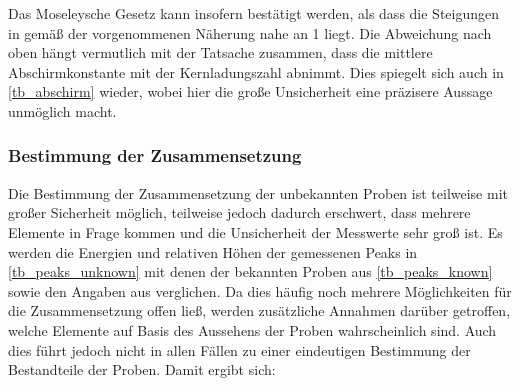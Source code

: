 \documentclass[
	a4paper,
	12pt,
	pagesize,
	ngerman
]{scrartcl}
\begin{document}
	Das Moseleysche Gesetz kann insofern bestätigt werden, als dass die Steigungen in  gemäß der vorgenommenen Näherung nahe an \num{1} liegt.
	Die Abweichung nach oben hängt vermutlich mit der Tatsache zusammen, dass die mittlere Abschirmkonstante mit der Kernladungszahl abnimmt.
	Dies spiegelt sich auch in \cref{tb_abschirm} wieder, wobei hier die große Unsicherheit eine präzisere Aussage unmöglich macht.

	\subsubsection{Bestimmung der Zusammensetzung}
	Die Bestimmung der Zusammensetzung der unbekannten Proben ist teilweise mit großer Sicherheit möglich, teilweise jedoch dadurch erschwert, dass mehrere Elemente in Frage kommen und die Unsicherheit der Messwerte sehr groß ist.
	Es werden die Energien und relativen Höhen der gemessenen Peaks in \cref{tb_peaks_unknown} mit denen der bekannten Proben aus \cref{tb_peaks_known} sowie den Angaben aus \cite{XRAYDB} verglichen.
	Da dies häufig noch mehrere Möglichkeiten für die Zusammensetzung offen ließ, werden zusätzliche Annahmen darüber getroffen, welche Elemente auf Basis des Aussehens der Proben wahrscheinlich sind.
	Auch dies führt jedoch nicht in allen Fällen zu einer eindeutigen Bestimmung der Bestandteile der Proben.
	Damit ergibt sich:
\end{document}

